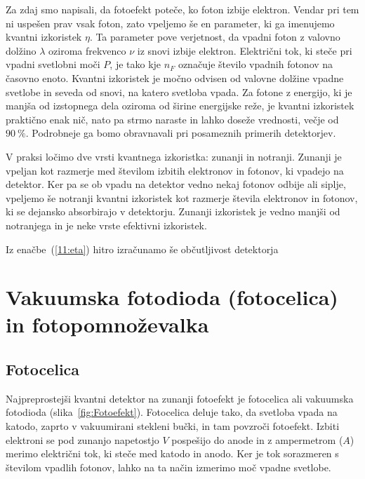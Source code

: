 Za zdaj smo napisali, da fotoefekt poteče, ko foton izbije elektron. Vendar pri tem ni 
uspešen prav vsak foton, zato vpeljemo še en parameter, ki ga imenujemo 
kvantni izkoristek $\eta$.
Ta parameter pove verjetnost, da vpadni foton z valovno dolžino $\lambda$ 
oziroma frekvenco $\nu$ iz snovi izbije elektron. 
Električni tok, ki steče pri vpadni svetlobni moči $P$, je tako
kje $n_F$ označuje število vpadnih fotonov na časovno enoto.
Kvantni izkoristek je močno odvisen od valovne dolžine vpadne svetlobe in seveda
od snovi, na katero svetloba vpada. Za fotone z energijo, ki je manjša od izstopnega 
dela oziroma od širine energijske reže, je kvantni izkoristek praktično enak nič, 
nato pa strmo naraste in lahko doseže vrednosti, večje od $90~\%$. Podrobneje ga bomo 
obravnavali pri posameznih primerih detektorjev.

\begin{remark}
V praksi ločimo dve vrsti kvantnega izkoristka: zunanji in notranji. Zunanji je vpeljan kot 
razmerje med številom izbitih elektronov in fotonov, ki vpadejo na detektor. Ker pa se 
ob vpadu na detektor vedno nekaj fotonov odbije ali siplje, vpeljemo še notranji kvantni 
izkoristek kot razmerje števila elektronov in fotonov, ki se dejansko absorbirajo v detektorju.
Zunanji izkoristek je vedno manjši od notranjega in je neke vrste efektivni 
izkoristek.
\end{remark}

Iz enačbe~(\ref{11:eta}) hitro izračunamo še občutljivost detektorja 

\section{Vakuumska fotodioda (fotocelica) in fotopomnoževalka}
\subsection*{Fotocelica}
Najpreprostejši kvantni detektor na zunanji fotoefekt je fotocelica ali vakuumska fotodioda
(slika~\ref{fig:Fotoefekt}). Fotocelica deluje tako, da svetloba vpada na katodo, 
zaprto v vakuumirani stekleni bučki, in tam povzroči fotoefekt. Izbiti elektroni 
se pod zunanjo napetostjo $V$ pospešijo do anode in z ampermetrom ($A$) 
merimo električni tok, ki steče med katodo in anodo. 
Ker je tok sorazmeren s številom vpadlih fotonov, lahko na ta 
način izmerimo moč vpadne svetlobe.

